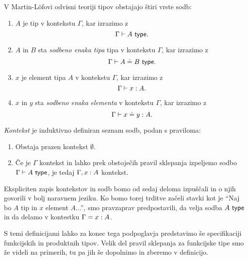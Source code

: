 \begin{definicija}
  V Martin-Löfovi odvisni teoriji tipov obstajajo štiri vrste sodb:
\begin{enumerate}
\item \(A\) je tip v kontekstu \(\Gamma\), kar izrazimo z \[\Gamma \vdash A\ \textnormal{\textsf{type}}.\]
\item \(A\) in \(B\) sta \emph{sodbeno enaka tipa} tipa v kontekstu \(\Gamma\),
  kar izrazimo z \[\Gamma \vdash A \doteq B\ \textnormal{\textsf{type}}.\]
\item \(x\) je element tipa \(A\) v kontekstu \(\Gamma\), kar izrazimo z
  \[\Gamma \vdash x : A.\]
\item \(x\) in \(y\) sta \emph{sodbeno enaka elementa} v kontekstu \(\Gamma\), kar izrazimo z
  \[\Gamma \vdash x \doteq y : A.\]
\end{enumerate}
\emph{Kontekst} je induktivno definiran seznam sodb, podan s praviloma:
\begin{enumerate}
\item Obstaja prazen kontekst \(\emptyset\).
\item Če je \(\Gamma\) kontekst in lahko prek obstoječih pravil sklepanja izpeljemo sodbo
  \(\Gamma \vdash A\ \textnormal{\textsf{type}}\), je tedaj \(\Gamma, x : A\) kontekst.
\end{enumerate}
\end{definicija}
Ekspliciten zapis kontekstov in sodb bomo od sedaj deloma izpuščali in o
njih govorili v bolj naravnem jeziku. Ko bomo torej trditve začeli stavki kot je
``Naj bo \(A\) tip in \(x\) element \(A\)...'', smo pravzaprav predpostavili, da velja
sodba \(A\ \textnormal{\textsf{type}}\) in da delamo v kontestku \(\Gamma = x : A\).

S temi definicijami lahko za konec tega podpoglavja predstavimo še specifikaciji
funkcijskih in produktnih tipov. Velik del pravil sklepanja za funkcijske tipe smo že
videli na primerih, tu pa jih še dopolnimo in zberemo v definicijo.

